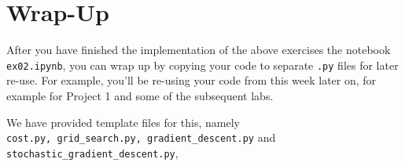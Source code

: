 \documentclass{../tex_import/ETHuebung_english}
\begin{document}
\section*{Wrap-Up}
After you have finished the implementation of the above exercises the notebook {\tt ex02.ipynb}, you can wrap up by copying your code to separate {\tt .py} files for later re-use. For example, you'll be re-using your code from this week later on, for example for Project 1 and some of the subsequent labs.

We have provided template files for this, namely\\
{\tt cost.py, grid\_search.py, gradient\_descent.py} and {\tt stochastic\_gradient\_descent.py},
\end{document}
